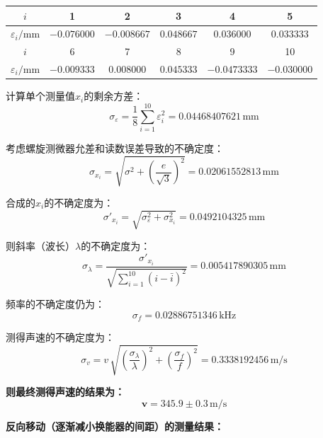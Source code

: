 \documentclass[a4paper,fontset=windows]{ctexart}
\begin{document}
    \vspace{0.5em}\begin{table}[ht!]\Large
        \begin{center}
            \begin{tabular}{ |c|c|c|c|c|c| }
                \hline
                $i$ & 1 & 2 & 3 & 4 & 5 \\
                \hline
                $\varepsilon_i/\mathrm{mm}$ & $-0.076000$ & $-0.008667$ & $0.048667$ & $0.036000$ & $0.033333$ \\
                \hline
                $i$ & 6 & 7 & 8 & 9 & 10 \\
                \hline
                $\varepsilon_i/\mathrm{mm}$ & $-0.009333$ & $0.008000$ & $0.045333$ & $-0.0473333$ & $-0.030000$ \\
                \hline
            \end{tabular}
        \end{center}
    \end{table}

    计算单个测量值$x_i$的剩余方差：
    \[
    \sigma_\varepsilon = \frac{1}{8}\sum_{i=1}^{10}\varepsilon_i^2 = 0.04468407621\,\mathrm{mm}
    \]

    考虑螺旋测微器允差和读数误差导致的不确定度：
    \[
    \sigma_{x_i} = \sqrt{\sigma^2 + \left(\frac{e}{\sqrt{3}}\right)^2} = 0.02061552813\,\mathrm{mm}
    \]

    合成的$x_i$的不确定度为：
    \[
    \sigma'_{x_i} = \sqrt{\sigma_\varepsilon^2 + \sigma_{x_i}^2} = 0.0492104325\,\mathrm{mm}
    \]

    则斜率（波长）$\lambda$的不确定度为：
    \[
    \sigma_{\lambda} = \frac{\sigma'_{x_i}}{\sqrt{\sum\limits_{i=1}^{10}(i-\bar{i})^2}} = 0.005417890305\,\mathrm{mm}
    \]

    频率的不确定度仍为：
    \[
    \sigma_f = 0.02886751346\,\mathrm{kHz}
    \]

    测得声速的不确定度为：
    \[
    \sigma_v = v \,\sqrt{\left(\frac{\sigma_{\lambda}}{\lambda}\right)^2 + \left(\frac{\sigma_f}{f}\right)^2} = 0.3338192456\,\mathrm{m/s}
    \]

    \textbf{则最终测得声速的结果为：}
    \[
    \boldsymbol{v = 345.9\pm0.3\,\mathrm{m/s}}
    \]

    \newpage
    \textbf{反向移动（逐渐减小换能器的间距）的测量结果：}
\end{document}

